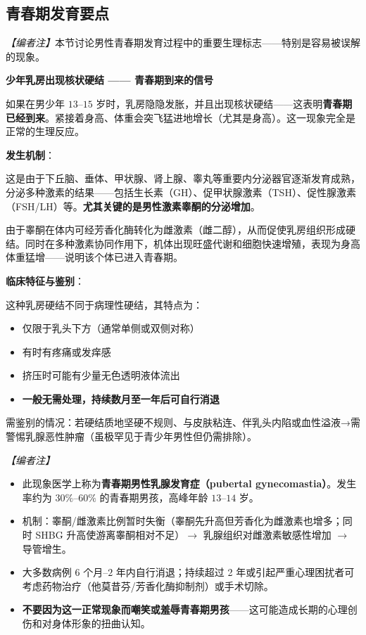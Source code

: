\subsection{青春期发育要点}

\noindent\textit{【编者注】}本节讨论男性青春期发育过程中的重要生理标志——特别是容易被误解的现象。

\vspace{0.5em}
\noindent\textbf{少年乳房出现核状硬结 —— 青春期到来的信号}

如果在男少年 $13$--$15$ 岁时，乳房隐隐发胀，并且出现核状硬结——这表明\textbf{青春期已经到来}。紧接着身高、体重会突飞猛进地增长（尤其是身高）。这一现象完全是正常的生理反应。

\vspace{0.5em}
\noindent\textbf{发生机制}：

这是由于下丘脑、垂体、甲状腺、肾上腺、睾丸等重要内分泌器官逐渐发育成熟，分泌多种激素的结果——包括生长素（GH）、促甲状腺激素（TSH）、促性腺激素（FSH/LH）等。\textbf{尤其关键的是男性激素睾酮的分泌增加}。

由于睾酮在体内可经芳香化酶转化为雌激素（雌二醇），从而促使乳房组织形成硬结。同时在多种激素协同作用下，机体出现旺盛代谢和细胞快速增殖，表现为身高体重猛增——说明该个体已进入青春期。

\vspace{0.5em}
\noindent\textbf{临床特征与鉴别}：

这种乳房硬结不同于病理性硬结，其特点为：
\begin{itemize}
	\item 仅限于乳头下方（通常单侧或双侧对称）
	\item 有时有疼痛或发痒感
	\item 挤压时可能有少量无色透明液体流出
	\item \textbf{一般无需处理，持续数月至一年后可自行消退}
\end{itemize}

需鉴别的情况：若硬结质地坚硬不规则、与皮肤粘连、伴乳头内陷或血性溢液→需警惕乳腺恶性肿瘤（虽极罕见于青少年男性但仍需排除）。

\vspace{0.5em}
\noindent\textit{【编者注】}
\begin{itemize}
	\item 此现象医学上称为\textbf{青春期男性乳腺发育症（pubertal gynecomastia）}。发生率约为 $30\%$--$60\%$ 的青春期男孩，高峰年龄 $13$--$14$ 岁。
	\item 机制：睾酮/雌激素比例暂时失衡（睾酮先升高但芳香化为雌激素也增多；同时 SHBG 升高使游离睾酮相对不足）$\rightarrow$ 乳腺组织对雌激素敏感性增加 $\rightarrow$ 导管增生。
	\item 大多数病例 $6$ 个月--$2$ 年内自行消退；持续超过 2 年或引起严重心理困扰者可考虑药物治疗（他莫昔芬/芳香化酶抑制剂）或手术切除。
	\item \textbf{不要因为这一正常现象而嘲笑或羞辱青春期男孩}——这可能造成长期的心理创伤和对身体形象的扭曲认知。
\end{itemize}


